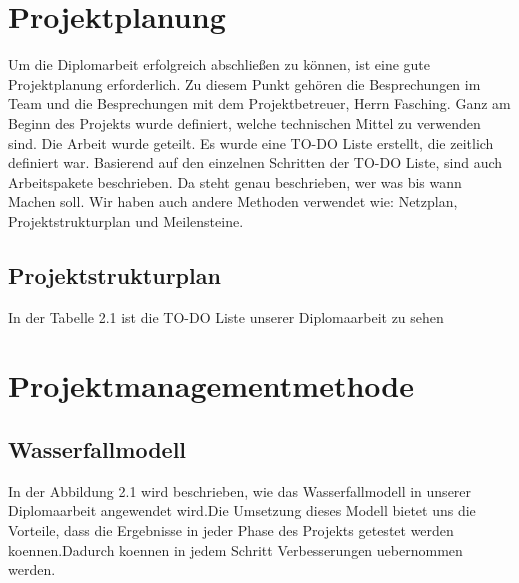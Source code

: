 \section{Projektplanung}
Um die Diplomarbeit erfolgreich abschließen zu k\"onnen, ist eine gute Projektplanung erforderlich. Zu diesem Punkt geh\"oren die Besprechungen im Team und die Besprechungen mit dem Projektbetreuer, Herrn Fasching. Ganz am Beginn des Projekts wurde definiert, welche technischen Mittel zu verwenden sind. Die Arbeit wurde geteilt. Es wurde eine TO-DO Liste erstellt, die zeitlich definiert war. Basierend auf den einzelnen Schritten der TO-DO Liste, sind auch Arbeitspakete beschrieben. Da steht genau beschrieben, wer was bis wann Machen soll. Wir haben auch andere Methoden verwendet wie: Netzplan, Projektstrukturplan und Meilensteine.

\subsection{Projektstrukturplan}
In der Tabelle 2.1 ist die TO-DO Liste unserer Diplomaarbeit zu sehen

\section{Projektmanagementmethode}
\subsection{Wasserfallmodell}
In der Abbildung 2.1 wird beschrieben, wie das Wasserfallmodell in unserer Diplomaarbeit angewendet wird.Die Umsetzung dieses Modell bietet uns die Vorteile, dass die Ergebnisse in jeder Phase des Projekts getestet werden koennen.Dadurch koennen in jedem Schritt Verbesserungen uebernommen werden.

